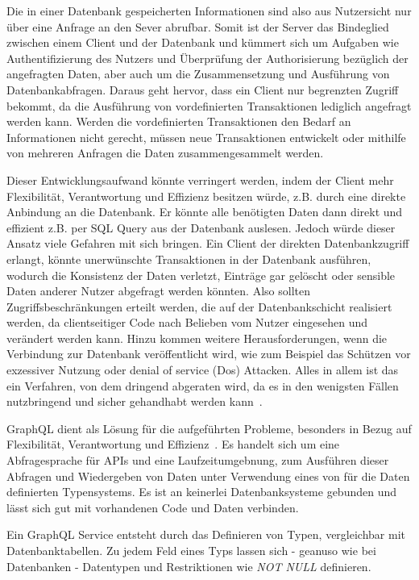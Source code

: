 Die in einer Datenbank gespeicherten Informationen sind also aus Nutzersicht nur über eine Anfrage an den Sever abrufbar.
Somit ist der Server das Bindeglied zwischen einem Client und der Datenbank und kümmert sich um Aufgaben wie Authentifizierung des Nutzers
und Überprüfung der Authorisierung bezüglich der angefragten Daten, aber auch um die Zusammensetzung und Ausführung von Datenbankabfragen.
Daraus geht hervor, dass ein Client nur begrenzten Zugriff bekommt, da die Ausführung von vordefinierten Transaktionen
lediglich angefragt werden kann. Werden die vordefinierten Transaktionen den Bedarf an Informationen nicht gerecht, müssen neue Transaktionen entwickelt
oder mithilfe von mehreren Anfragen die Daten zusammengesammelt werden.

Dieser Entwicklungsaufwand könnte verringert werden, indem der Client mehr Flexibilität, Verantwortung und Effizienz besitzen würde,
z.B. durch eine direkte Anbindung an die Datenbank.
Er könnte alle benötigten Daten dann direkt und effizient z.B. per SQL Query aus der Datenbank auslesen.
Jedoch würde dieser Ansatz viele Gefahren mit sich bringen. Ein Client der direkten Datenbankzugriff erlangt,
könnte unerwünschte Transaktionen in der Datenbank ausführen, wodurch die Konsistenz der Daten verletzt,
Einträge gar gelöscht oder sensible Daten anderer Nutzer abgefragt werden könnten. Also sollten Zugriffsbeschränkungen erteilt werden, die
auf der Datenbankschicht realisiert werden, da clientseitiger Code nach Belieben vom Nutzer eingesehen und verändert werden kann.
Hinzu kommen weitere Herausforderungen, wenn die Verbindung zur Datenbank veröffentlicht wird,
wie zum Beispiel das Schützen vor exzessiver Nutzung oder denial of service (Dos) Attacken.
Alles in allem ist das ein Verfahren, von dem dringend abgeraten wird, da es in den wenigsten Fällen nutzbringend und sicher gehandhabt werden kann~\cite{client-to-database}.


GraphQL dient als Lösung für die aufgeführten Probleme, besonders in Bezug auf Flexibilität, Verantwortung und Effizienz~\cite{graphql-scalablepath}.
Es handelt sich um eine Abfragesprache für APIs und eine Laufzeitumgebnung,
zum Ausführen dieser Abfragen und Wiedergeben von Daten unter Verwendung eines von für die Daten definierten Typensystems.
Es ist an keinerlei Datenbanksysteme gebunden und lässt sich gut mit vorhandenen Code und Daten verbinden.

Ein GraphQL Service entsteht durch das Definieren von Typen, vergleichbar mit Datenbanktabellen. Zu jedem Feld eines Typs lassen sich - geanuso wie bei Datenbanken -
Datentypen und Restriktionen wie \emph{NOT NULL} definieren.

